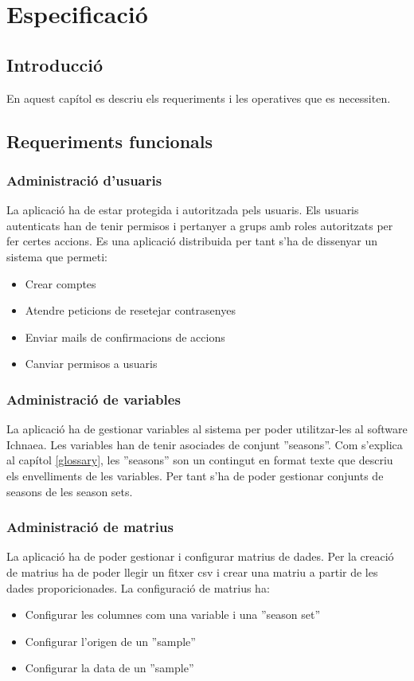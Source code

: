 \chapter{Especificaci\'{o}}
\label{cha:specification}


\section{Introducci\'{o}}
En aquest cap\'{i}tol es descriu els requeriments i les operatives que es necessiten.\\


\section{Requeriments funcionals}

\subsection{Administraci\'{o} d'usuaris}
La aplicaci\'{o} ha de estar protegida i autoritzada pels usuaris. Els usuaris autenticats han de tenir permisos i  pertanyer a grups amb roles autoritzats per fer certes accions. Es una aplicaci\'{o} distribuida per tant s'ha de dissenyar un sistema que permeti:
\begin{itemize}
\item Crear comptes
\item Atendre peticions de resetejar contrasenyes
\item Enviar mails de confirmacions de accions
\item Canviar permisos a usuaris
\end{itemize}

\subsection{Administraci\'{o} de variables}
La aplicaci\'{o} ha de gestionar variables al sistema per poder utilitzar-les al software Ichnaea. Les variables han de tenir asociades de conjunt ''seasons''. Com s'explica al cap\'{i}tol \ref{glossary}, les ''seasons'' son un contingut en format texte que descriu els envelliments de les variables. Per tant s'ha de poder gestionar conjunts de seasons de les season sets.\\

\subsection{Administraci\'{o} de matrius}
La aplicaci\'{o} ha de poder gestionar i configurar matrius de dades. Per la creaci\'{o} de matrius ha de poder llegir un fitxer csv i crear una matriu a partir de les dades proporicionades.
La configuraci\'{o} de matrius ha:
\begin{itemize}
\item Configurar les columnes com una variable i una ''season set''
\item Configurar l'origen de un ''sample''
\item Configurar la data de un ''sample''
\end{itemize}

